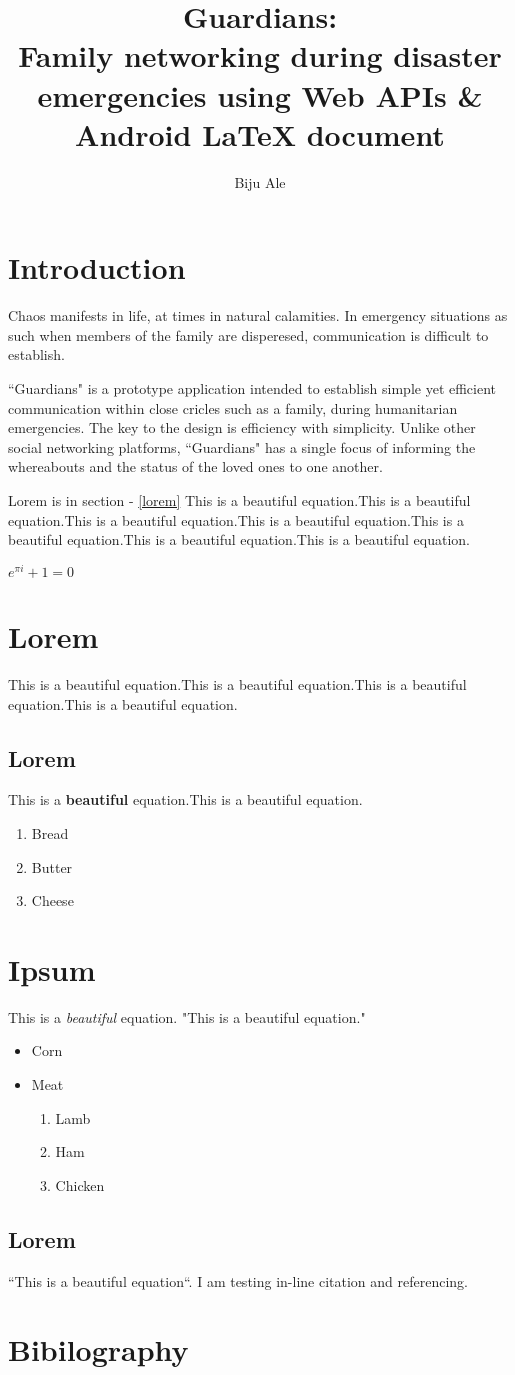 \documentclass[11pt,a4paper]{article}
\author{Biju Ale}
\title{Guardians: \\Family networking during disaster emergencies using Web APIs \& Android {\LaTeX} document}
\begin{document}
\maketitle

\section{Introduction}

Chaos manifests in life, at times in natural calamities. In emergency situations as such when members of the family are disperesed, communication is difficult to establish. 

``Guardians" is a prototype application intended to establish simple yet efficient communication within close cricles such as a family, during humanitarian emergencies. The key to the design is efficiency with simplicity. Unlike other social networking platforms, ``Guardians" has a single focus of informing the whereabouts and the status of the loved ones to one another.

Lorem is in section - \ref{lorem}
This is a beautiful equation.This is a beautiful equation.This is a beautiful equation.This is a beautiful equation.This is a beautiful equation.This is a beautiful equation.This is a beautiful equation.

$e^{\pi i} + 1 = 0$

\section{Lorem\label{lorem}}
This is a beautiful equation.This is a beautiful equation.This is a beautiful equation.This is a beautiful equation.
\subsection{Lorem}
This is a \textbf{beautiful} equation.This is a beautiful equation.
\begin{enumerate}
	\item Bread
	\item Butter
	\item Cheese
\end{enumerate}

\section{Ipsum}
This is a \emph{beautiful} equation. "This is a beautiful equation."
\begin{itemize}
	\item Corn
	\item Meat
	\begin{enumerate}
		\item Lamb
		\item Ham
		\item Chicken
	\end{enumerate}
\end{itemize}
\subsection{Lorem}
``This is a beautiful equation``. I am testing in-line citation and referencing.\textcite{geb}

\section{Bibilography}
\printbibliography
\end{document}
